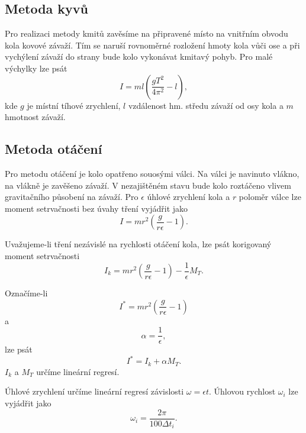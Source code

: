 \documentclass[protokol.tex]{subfiles}
\begin{document}
\subsection*{Metoda kyvů}
Pro realizaci metody kmitů zavěsíme na připravené místo na vnitřním obvodu kola kovové závaží. Tím se naruší rovnoměrné rozložení hmoty kola vůči ose a při vychýlení závaží do strany bude kolo vykonávat kmitavý pohyb. Pro malé výchylky lze psát \cite{stud_text}
\begin{equation} \label{eq:kyv}
I = m l \left( \frac{g T^2}{4 \pi^2} - l \right),
\end{equation}
kde $g$ je místní tíhové zrychlení, $l$ vzdálenost hm. středu závaží od osy kola a $m$ hmotnost závaží.

\subsection*{Metoda otáčení}
Pro metodu otáčení je kolo opatřeno souosými válci. Na válci je navinuto vlákno, na vlákně je zavěšeno závaží. V nezajištěném stavu bude kolo roztáčeno vlivem gravitačního působení na závaží. Pro $\epsilon$ úhlové zrychlení kola a $r$ poloměr válce lze moment setrvačnosti bez úvahy tření vyjádřit jako \cite{stud_text}
\begin{equation}
I = m r^2 \left( \frac{g}{r \epsilon} - 1 \right).
\end{equation}

Uvažujeme-li tření nezávislé na rychlosti otáčení kola, lze psát korigovaný moment setrvačnosti \cite{stud_text}
\begin{equation}
I_k = m r^2 \left( \frac{g}{r \epsilon} - 1 \right) - \frac{1}{\epsilon} M_T.
\end{equation}

Označíme-li 
\begin{equation}
I^* = m r^2 \left( \frac{g}{r \epsilon} - 1 \right)
\end{equation}
a
\begin{equation}
\alpha = \frac{1}{\epsilon}, 
\end{equation}
lze psát \cite{stud_text}
\begin{equation} \label{eq:nekorig_na_alpha}
I^* = I_k + \alpha M_T.
\end{equation}
$I_k$ a $M_T$ určíme lineární regresí.

Úhlové zrychlení určíme lineární regresí závislosti $\omega = \epsilon t$. Úhlovou rychlost $\omega_i$ lze vyjádřit jako \cite{stud_text}
\begin{equation}
\omega_i = \frac{2 \pi}{100 \Delta t_i}.
\end{equation}
\end{document}
